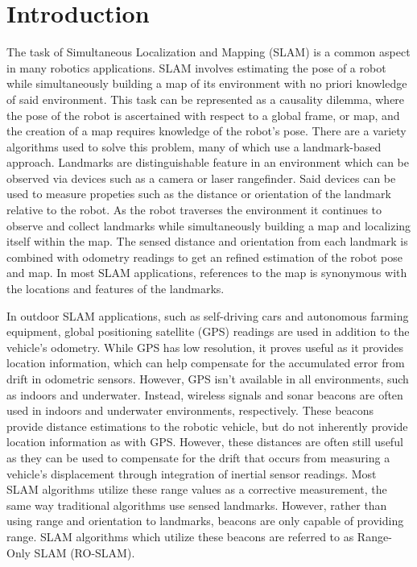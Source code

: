 \documentclass[conference]{IEEEtran}
\begin{document}
	\section{Introduction} 
	
		The task of Simultaneous Localization and Mapping (SLAM) is a common aspect in many robotics applications. SLAM involves estimating the pose of a robot while simultaneously building a map of its environment with no priori knowledge of said environment. This task can be represented as a causality dilemma, where the pose of the robot is ascertained with respect to a global frame, or map, and the creation of a map requires knowledge of the robot's pose. There are a variety algorithms used to solve this problem, many of which use a landmark-based approach. Landmarks are distinguishable feature in an environment which can be observed via devices such as a camera or laser rangefinder. Said devices can be used to measure propeties such as the distance or orientation of the landmark relative to the robot. As the robot traverses the environment it continues to observe and collect landmarks while simultaneously building a map and localizing itself within the map. The sensed distance and orientation from each landmark is combined with odometry readings to get an refined estimation of the robot pose and map. 
		In most SLAM applications, references to the map is synonymous with the locations and features of the landmarks.
		
		
		In outdoor SLAM applications, such as self-driving cars and autonomous farming equipment, global positioning satellite (GPS) readings are used in addition to the vehicle's odometry. %
		While GPS has low resolution, it proves useful as it provides location information, which can help compensate for the accumulated error from drift in odometric sensors. However, GPS isn't available in all environments, such as indoors and underwater. Instead, wireless signals and sonar beacons are often used in indoors and underwater environments, respectively. These beacons provide distance estimations to the robotic vehicle, but do not inherently provide location information as with GPS. However, these distances are often still useful as they can be used to compensate for the drift that occurs from measuring a vehicle's displacement through integration of inertial sensor readings. Most SLAM algorithms utilize these range values as a corrective measurement, the same way traditional algorithms use sensed landmarks. However, rather than using range and orientation to landmarks, beacons are only capable of providing range. SLAM algorithms which utilize these beacons are referred to as Range-Only SLAM (RO-SLAM). 
		
\end{document}
